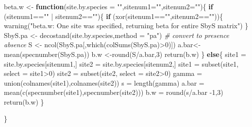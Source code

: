 \documentclass[
]{article}
\newenvironment{Shaded}{\begin{snugshade}}{\end{snugshade}}
\newcommand{\AttributeTok}[1]{\textcolor[rgb]{0.77,0.63,0.00}{#1}}
\newcommand{\CommentTok}[1]{\textcolor[rgb]{0.56,0.35,0.01}{\textit{#1}}}
\newcommand{\ControlFlowTok}[1]{\textcolor[rgb]{0.13,0.29,0.53}{\textbf{#1}}}
\newcommand{\DecValTok}[1]{\textcolor[rgb]{0.00,0.00,0.81}{#1}}
\newcommand{\FunctionTok}[1]{\textcolor[rgb]{0.00,0.00,0.00}{#1}}
\newcommand{\NormalTok}[1]{#1}
\newcommand{\OtherTok}[1]{\textcolor[rgb]{0.56,0.35,0.01}{#1}}
\newcommand{\SpecialCharTok}[1]{\textcolor[rgb]{0.00,0.00,0.00}{#1}}
\newcommand{\StringTok}[1]{\textcolor[rgb]{0.31,0.60,0.02}{#1}}
\begin{document}
\begin{Shaded}
\begin{Highlighting}[]
\NormalTok{beta.w }\OtherTok{\textless{}{-}} \ControlFlowTok{function}\NormalTok{(}\AttributeTok{site.by.species =} \StringTok{""}\NormalTok{,}\AttributeTok{sitenum1=}\StringTok{""}\NormalTok{,}\AttributeTok{sitenum2=}\StringTok{""}\NormalTok{)\{}
  \ControlFlowTok{if}\NormalTok{ (sitenum1}\SpecialCharTok{==}\StringTok{""} \SpecialCharTok{|}\NormalTok{ sitenum2}\SpecialCharTok{==}\StringTok{""}\NormalTok{)\{}
    \ControlFlowTok{if}\NormalTok{ (}\FunctionTok{xor}\NormalTok{(sitenum1}\SpecialCharTok{==}\StringTok{""}\NormalTok{,sitenum2}\SpecialCharTok{==}\StringTok{""}\NormalTok{))\{}
      \FunctionTok{warning}\NormalTok{(}\StringTok{"beta.w: One site was specified, returning beta for entire SbyS matrix"}\NormalTok{)}
\NormalTok{    \}}
\NormalTok{    SbyS.pa }\OtherTok{\textless{}{-}} \FunctionTok{decostand}\NormalTok{(site.by.species,}\AttributeTok{method =} \StringTok{"pa"}\NormalTok{) }\CommentTok{\# convert to presence absence}
\NormalTok{    S }\OtherTok{\textless{}{-}} \FunctionTok{ncol}\NormalTok{(SbyS.pa[,}\FunctionTok{which}\NormalTok{(}\FunctionTok{colSums}\NormalTok{(SbyS.pa)}\SpecialCharTok{\textgreater{}}\DecValTok{0}\NormalTok{)])}
\NormalTok{    a.bar}\OtherTok{\textless{}{-}}\FunctionTok{mean}\NormalTok{(}\FunctionTok{specnumber}\NormalTok{(SbyS.pa))}
\NormalTok{    b.w }\OtherTok{\textless{}{-}}\FunctionTok{round}\NormalTok{(S}\SpecialCharTok{/}\NormalTok{a.bar,}\DecValTok{3}\NormalTok{)}
    \FunctionTok{return}\NormalTok{(b.w)}
\NormalTok{  \}}
  \ControlFlowTok{else}\NormalTok{\{}
\NormalTok{    site1 }\OtherTok{=}\NormalTok{ site.by.species[sitenum1,]}
\NormalTok{    site2 }\OtherTok{=}\NormalTok{ site.by.species[sitenum2,]}
\NormalTok{    site1 }\OtherTok{=} \FunctionTok{subset}\NormalTok{(site1, }\AttributeTok{select =}\NormalTok{ site1}\SpecialCharTok{\textgreater{}}\DecValTok{0}\NormalTok{)}
\NormalTok{    site2 }\OtherTok{=} \FunctionTok{subset}\NormalTok{(site2, }\AttributeTok{select =}\NormalTok{ site2}\SpecialCharTok{\textgreater{}}\DecValTok{0}\NormalTok{)}
\NormalTok{    gamma }\OtherTok{=} \FunctionTok{union}\NormalTok{(}\FunctionTok{colnames}\NormalTok{(site1),}\FunctionTok{colnames}\NormalTok{(site2))}
\NormalTok{    s }\OtherTok{=} \FunctionTok{length}\NormalTok{(gamma)}
\NormalTok{    a.bar }\OtherTok{=} \FunctionTok{mean}\NormalTok{(}\FunctionTok{c}\NormalTok{(}\FunctionTok{specnumber}\NormalTok{(site1),}\FunctionTok{specnumber}\NormalTok{(site2)))}
\NormalTok{    b.w }\OtherTok{=} \FunctionTok{round}\NormalTok{(s}\SpecialCharTok{/}\NormalTok{a.bar }\SpecialCharTok{{-}}\DecValTok{1}\NormalTok{,}\DecValTok{3}\NormalTok{)}
    \FunctionTok{return}\NormalTok{(b.w)}
\NormalTok{  \}}
  
\NormalTok{\}}
\end{Highlighting}
\end{Shaded}
\end{document}

